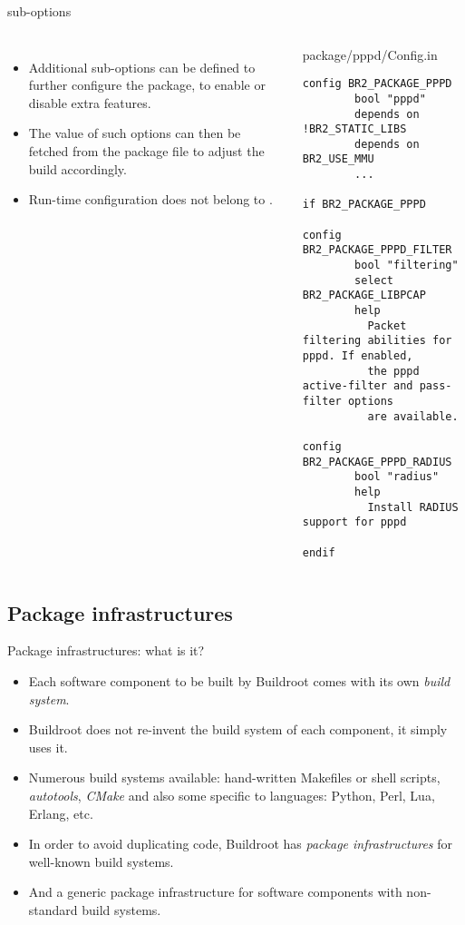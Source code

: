 \begin{frame}[fragile]{ sub-options}
  \begin{columns}
    \begin{itemize}
    \item Additional sub-options can be defined to further configure
      the package, to enable or disable extra features.
    \item The value of such options can then be fetched from the package
       file to adjust the build accordingly.
    \item Run-time configuration does not belong to .
    \end{itemize}
    \begin{block}{package/pppd/Config.in}
      \tiny
\begin{verbatim}
config BR2_PACKAGE_PPPD
        bool "pppd"
        depends on !BR2_STATIC_LIBS
        depends on BR2_USE_MMU
        ...

if BR2_PACKAGE_PPPD

config BR2_PACKAGE_PPPD_FILTER
        bool "filtering"
        select BR2_PACKAGE_LIBPCAP
        help
          Packet filtering abilities for pppd. If enabled,
          the pppd active-filter and pass-filter options
          are available.

config BR2_PACKAGE_PPPD_RADIUS
        bool "radius"
        help
          Install RADIUS support for pppd

endif
\end{verbatim}
    \end{block}
  \end{columns}
\end{frame}

\subsection{Package infrastructures}

\begin{frame}{Package infrastructures: what is it?}
  \begin{itemize}
  \item Each software component to be built by Buildroot comes with
    its own {\em build system}.
  \item Buildroot does not re-invent the build system of each
    component, it simply uses it.
  \item Numerous build systems available: hand-written Makefiles or
    shell scripts, {\em autotools}, {\em CMake} and also some specific
    to languages: Python, Perl, Lua, Erlang, etc.
  \item In order to avoid duplicating code, Buildroot has {\em package
      infrastructures} for well-known build systems.
  \item And a generic package infrastructure for software components
    with non-standard build systems.
  \end{itemize}
\end{frame}

